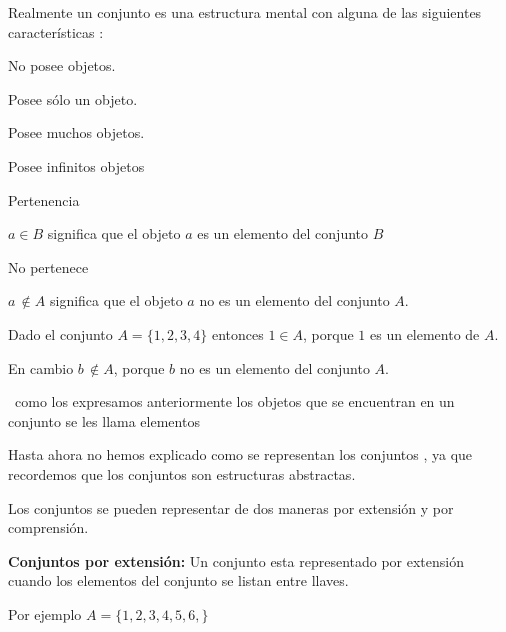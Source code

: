 Realmente un conjunto es una estructura mental con alguna de las siguientes
características :

\begin{lista}

\item  No posee objetos.

\item  Posee sólo un objeto.

\item  Posee muchos objetos.

\item  Posee infinitos objetos

\end{lista}

\begin{defi}{ Pertenencia}{}

$a\in B$ significa que el objeto $a$ es un elemento del conjunto
$B$

\end{defi}

\begin{defi}{ No pertenece}{}

$a\,\notin A$ significa que el objeto $a$ no es un elemento del
conjunto $A.$\end{defi}

\begin{ejemplo} Dado el conjunto $A=\{1,2,3,4\}$ entonces $1\in A$,
porque $1$ es un elemento de $A.$

En cambio $b\,\notin A$, porque $b$ no es un elemento del conjunto
$A.$

\end{ejemplo}

\obs\ como los expresamos anteriormente los objetos que se encuentran
en un conjunto se les llama elementos

Hasta ahora no hemos explicado como se representan los conjuntos ,
ya que recordemos que los conjuntos son estructuras abstractas.

Los conjuntos se pueden representar de dos maneras por extensión y
por comprensión.

\vspace*{-70pt}\begin{ideabox}{\bf Conjuntos por extensión:} Un
conjunto esta representado por extensión cuando los elementos del
conjunto se listan entre llaves.\end{ideabox}

Por ejemplo $A=\{1,2,3,4,5,6,\}$

